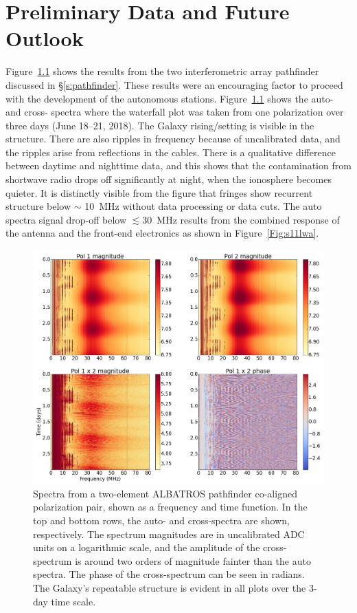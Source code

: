 \chapter{Preliminary Data and Future Outlook}\label{s:Prel}

Figure~\ref{Fig:pathfinderresults} shows the results from the two interferometric array pathfinder discussed in \S\ref{s:pathfinder}. These results were an encouraging factor to proceed with the development of the autonomous stations. Figure~\ref{Fig:pathfinderresults} shows the auto- and cross- spectra where the waterfall plot was taken from one polarization over three days (June 18–21, 2018). The Galaxy rising/setting is visible in the structure. There are also ripples in frequency because of uncalibrated data, and the ripples arise from reflections in the cables. There is a qualitative difference between daytime and nighttime data, and this shows that the contamination from shortwave radio drops off significantly at night, when the ionosphere becomes quieter. It is distinctly visible from the figure that fringes show recurrent structure below $\sim$ \SI{10}{\mega\hertz} without data processing or data cuts. The auto spectra signal drop-off below $\lesssim$\SI{ 30}{\mega\hertz} results from the combined response of the antenna and the front-end electronics as shown in Figure~\ref{Fig:s11lwa}.

\begin{figure}
	\centering
	\includegraphics[width=0.9\linewidth]{"Figures/pathfinder results"}
	\caption{Spectra from a two-element ALBATROS pathfinder co-aligned polarization pair, shown as a frequency and time function. In the top and bottom rows, the auto- and cross-spectra are shown, respectively. The spectrum magnitudes are in uncalibrated ADC units on a logarithmic scale, and the amplitude of the cross-spectrum is around two orders of magnitude fainter than the auto spectra. The phase of the cross-spectrum can be seen in radians. The Galaxy's repeatable structure is evident in all plots over the 3-day time scale.}
	\label{Fig:pathfinderresults}
\end{figure}

